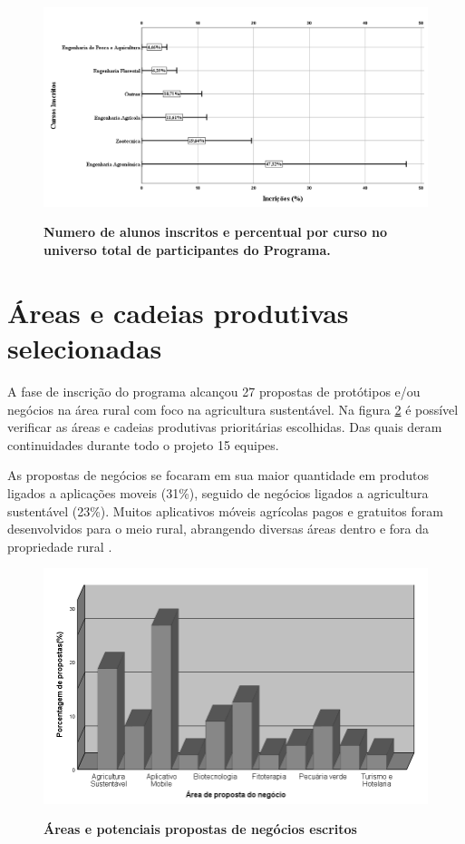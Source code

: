 \begin{figure}[H]
\caption{\textbf{Numero de alunos inscritos e percentual por curso no universo total de participantes do Programa.}}
\centering
\includegraphics[scale=0.3]{Imagens/inscritos.png}
\label{figura_10}
\end{figure}

\section{Áreas e cadeias produtivas selecionadas}

A fase de inscrição do programa alcançou 27 propostas de protótipos e/ou negócios na área rural com foco na agricultura sustentável. Na figura \ref{figura_11} é possível verificar as áreas e cadeias produtivas prioritárias escolhidas. Das quais deram continuidades durante todo o projeto 15 equipes.

As propostas de negócios se focaram em sua maior quantidade em produtos ligados a aplicações moveis (31\%), seguido de negócios ligados a agricultura sustentável (23\%). Muitos aplicativos móveis agrícolas pagos e gratuitos foram desenvolvidos para o meio rural, abrangendo diversas áreas dentro e fora da propriedade rural \cite{silva_caracterizacao_2017}. 




\begin{figure}[H]
\centering
\caption{\textbf{Áreas e potenciais propostas de negócios escritos}}
\includegraphics[scale=0.6]{Imagens/propostas_negocios.png}
\label{figura_11}
\end{figure}


